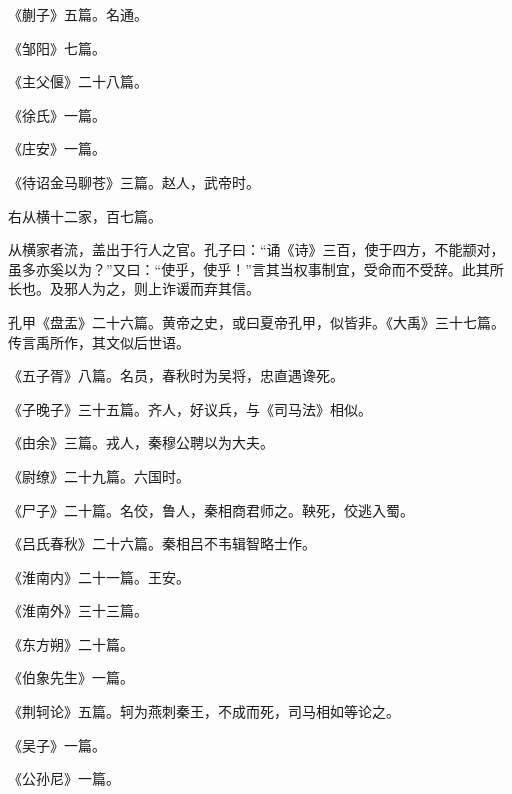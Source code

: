 \documentclass[12pt,UTF8]{ctexbook}
\begin{document}
《蒯子》五篇。名通。



《邹阳》七篇。



《主父偃》二十八篇。



《徐氏》一篇。



《庄安》一篇。



《待诏金马聊苍》三篇。赵人，武帝时。



右从横十二家，百七篇。



从横家者流，盖出于行人之官。孔子曰：“诵《诗》三百，使于四方，不能颛对，虽多亦奚以为？”又曰：“使乎，使乎！”言其当权事制宜，受命而不受辞。此其所长也。及邪人为之，则上诈谖而弃其信。



孔甲《盘盂》二十六篇。黄帝之史，或曰夏帝孔甲，似皆非。《大禹》三十七篇。传言禹所作，其文似后世语。



《五子胥》八篇。名员，春秋时为吴将，忠直遇谗死。



《子晚子》三十五篇。齐人，好议兵，与《司马法》相似。



《由余》三篇。戎人，秦穆公聘以为大夫。



《尉缭》二十九篇。六国时。



《尸子》二十篇。名佼，鲁人，秦相商君师之。鞅死，佼逃入蜀。



《吕氏春秋》二十六篇。秦相吕不韦辑智略士作。



《淮南内》二十一篇。王安。



《淮南外》三十三篇。



《东方朔》二十篇。



《伯象先生》一篇。



《荆轲论》五篇。轲为燕刺秦王，不成而死，司马相如等论之。



《吴子》一篇。



《公孙尼》一篇。
\end{document}
